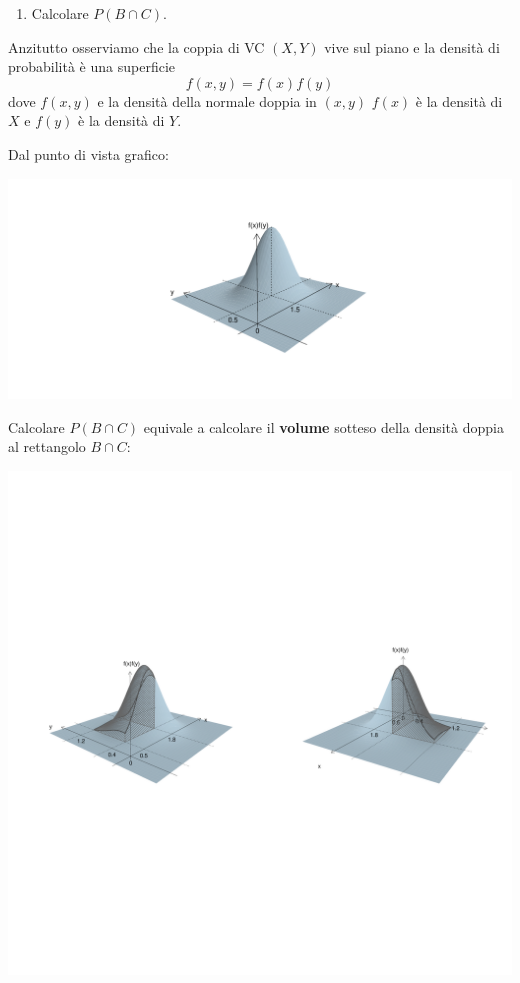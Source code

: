 \documentclass[
  11pt,
]{book}
\providecommand{\tightlist}{%
  \setlength{\itemsep}{0pt}\setlength{\parskip}{0pt}}
\theoremstyle{mytheoremstyle}
\theoremstyle{mydefstyle}
\begin{document}
\begin{enumerate}
\def\labelenumi{\arabic{enumi}.}
\setcounter{enumi}{6}
\tightlist
\item
  Calcolare \(P(B\cap C)\).
\end{enumerate}

Anzitutto osserviamo che la coppia di VC \((X,Y)\) vive sul piano e la densità di probabilità
è una superficie
\[f(x,y)=f(x)f(y)\]
dove \(f(x,y)\) e la densità della normale doppia in \((x,y)\) \(f(x)\) è la densità di \(X\) e \(f(y)\) è la densità di \(Y\).

Dal punto di vista grafico:

\begin{center}\includegraphics{Appunti_di_Statistica_2025_files/figure-latex/07d-Esercizi-Normale-17-1} \end{center}

Calcolare \(P(B\cap C)\) equivale a calcolare il \textbf{volume} sotteso della densità doppia al rettangolo \(B\cap C\):

\begin{center}\includegraphics{Appunti_di_Statistica_2025_files/figure-latex/07d-Esercizi-Normale-18-1} \end{center}
\end{document}
